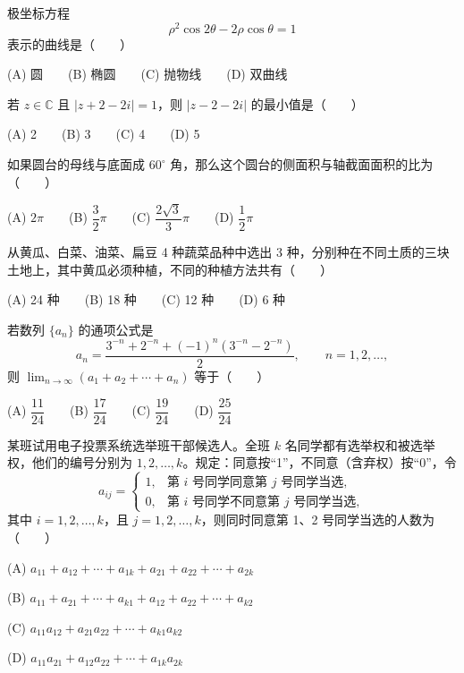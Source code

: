 \begin{question}
极坐标方程
\nopagebreak[4]
\[
   \rho^2\cos 2\theta-2\rho\cos\theta=1
\]
   表示的曲线是\mbox{（　　）}

   (A) 圆　　(B) 椭圆　　(C) 抛物线　　(D) 双曲线

\end{question}
\begin{question}
若 \(z\in\mathbb C\) 且 \(|z+2-2i|=1\)，则 \(|z-2-2i|\) 的最小值是\mbox{（　　）}

   (A) 2　　(B) 3　　(C) 4　　(D) 5

\end{question}
\begin{question}
如果圆台的母线与底面成 \(60^\circ\) 角，那么这个圆台的侧面积与轴截面面积的比为\mbox{（　　）}

   (A) \(2\pi\)　　(B) \(\dfrac{3}{2}\pi\)　　(C) \(\dfrac{2\sqrt3}{3}\pi\)　　(D) \(\dfrac12\pi\)

\end{question}
\begin{question}
从黄瓜、白菜、油菜、扁豆 4 种蔬菜品种中选出 3 种，分别种在不同土质的三块土地上，其中黄瓜必须种植，不同的种植方法共有\mbox{（　　）}

   (A) 24 种　　(B) 18 种　　(C) 12 种　　(D) 6 种

\end{question}
\begin{question}
若数列 \(\{a_n\}\) 的通项公式是
\nopagebreak[4]
\[
   a_n=\frac{3^{-n}+2^{-n}+(-1)^n(3^{-n}-2^{-n})}{2},\qquad n=1,2,\ldots,
\]
   则 \(\displaystyle\lim_{n\to\infty}(a_1+a_2+\cdots+a_n)\) 等于\mbox{（　　）}

   (A) \(\dfrac{11}{24}\)　　(B) \(\dfrac{17}{24}\)　　(C) \(\dfrac{19}{24}\)　　(D) \(\dfrac{25}{24}\)

\end{question}
\begin{question}
某班试用电子投票系统选举班干部候选人。全班 \(k\) 名同学都有选举权和被选举权，他们的编号分别为 \(1,2,\ldots,k\)。规定：同意按“1”，不同意（含弃权）按“0”，令
\nopagebreak[4]
\[
    a_{ij}=\begin{cases}
    1,&\text{第 }i\text{ 号同学同意第 }j\text{ 号同学当选},\\
    0,&\text{第 }i\text{ 号同学不同意第 }j\text{ 号同学当选},
    \end{cases}
\]
    其中 \(i=1,2,\ldots,k\)，且 \(j=1,2,\ldots,k\)，则同时同意第 1、2 号同学当选的人数为\mbox{（　　）}

    (A) \(a_{11}+a_{12}+\cdots+a_{1k}+a_{21}+a_{22}+\cdots+a_{2k}\)

    (B) \(a_{11}+a_{21}+\cdots+a_{k1}+a_{12}+a_{22}+\cdots+a_{k2}\)

    (C) \(a_{11}a_{12}+a_{21}a_{22}+\cdots+a_{k1}a_{k2}\)

    (D) \(a_{11}a_{21}+a_{12}a_{22}+\cdots+a_{1k}a_{2k}\)

\end{question}

